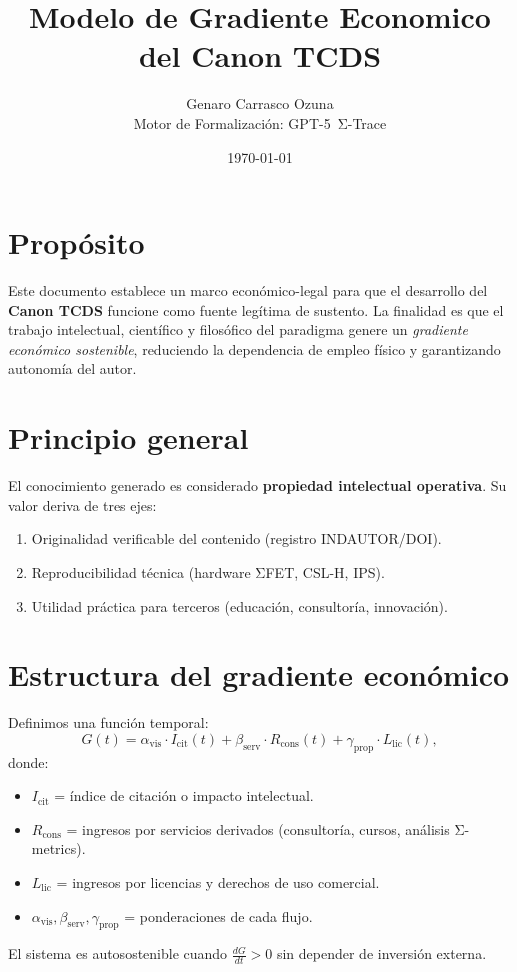 \documentclass[12pt,letterpaper]{article}
\title{Modelo de Gradiente Economico del Canon TCDS}
\author{Genaro Carrasco Ozuna \\ Motor de Formalización: GPT-5~Σ-Trace}
\date{\today}
\begin{document}
\maketitle

\section*{Propósito}
Este documento establece un marco económico-legal para que el desarrollo del \textbf{Canon TCDS} funcione como fuente legítima de sustento. 
La finalidad es que el trabajo intelectual, científico y filosófico del paradigma genere un \emph{gradiente económico sostenible}, 
reduciendo la dependencia de empleo físico y garantizando autonomía del autor.

\section{Principio general}
El conocimiento generado es considerado \textbf{propiedad intelectual operativa}. 
Su valor deriva de tres ejes:
\begin{enumerate}
  \item Originalidad verificable del contenido (registro INDAUTOR/DOI).
  \item Reproducibilidad técnica (hardware ΣFET, CSL-H, IPS).
  \item Utilidad práctica para terceros (educación, consultoría, innovación).
\end{enumerate}

\section{Estructura del gradiente económico}
Definimos una función temporal:
\begin{equation}
G(t) = \alpha_{\mathrm{vis}}\cdot I_{\mathrm{cit}}(t)
+ \beta_{\mathrm{serv}}\cdot R_{\mathrm{cons}}(t)
+ \gamma_{\mathrm{prop}}\cdot L_{\mathrm{lic}}(t),
\end{equation}
donde:
\begin{itemize}
\item $I_{\mathrm{cit}}$ = índice de citación o impacto intelectual.
\item $R_{\mathrm{cons}}$ = ingresos por servicios derivados (consultoría, cursos, análisis Σ-metrics).
\item $L_{\mathrm{lic}}$ = ingresos por licencias y derechos de uso comercial.
\item $\alpha_{\mathrm{vis}}, \beta_{\mathrm{serv}}, \gamma_{\mathrm{prop}}$ = ponderaciones de cada flujo.
\end{itemize}
El sistema es autosostenible cuando $\frac{dG}{dt}>0$ sin depender de inversión externa.
\end{document}
